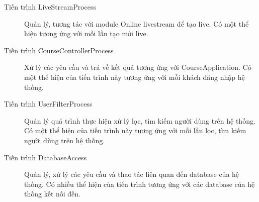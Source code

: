 \documentclass[./../main_file.tex]{subfiles}
\begin{document}
\begin{description}
		\item[Tiến trình LiveStreamProcess] Quản lý, tương tác với module Online livestream để tạo live. Có một thể hiện tương ứng với mỗi lần tạo mới live.
		\item[Tiến trình CourseControllerProcess] Xử lý các yêu cầu và trả về kết quả tương ứng với CourseApplication. Có một thể hiện của tiến trình này tương ứng với mỗi khách đăng nhập hệ thống.
		\item[Tiến trình UserFilterProcess] Quản lý quá trình thực hiện xử lý lọc, tìm kiếm người dùng trên hệ thống. 
		Có một thể hiện của tiến trình này tương ứng với mỗi lần lọc, tìm kiếm người dùng trên hệ thống.
		\item[Tiến trình DatabaseAccess] Quản lý, xử lý các yêu cầu và thao tác liên quan đến database của hệ thống. Có nhiều thể hiện của tiến trình tương ứng với các database của hệ thống kết nối đến.
	\end{description}
\end{document}
